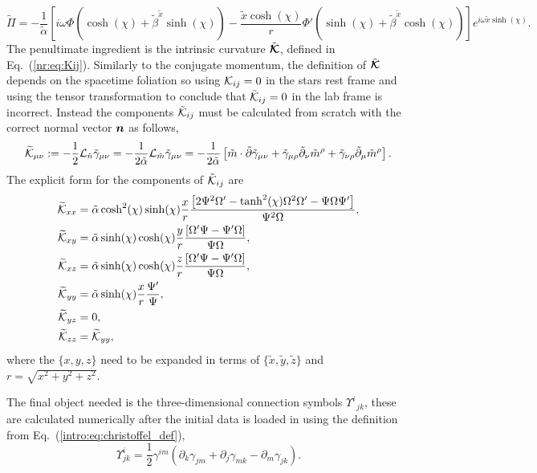 \begin{equation} \widetilde{\Pi} = -\frac{1}{\tilde{\alpha}}\left[ i\omega \Phi \left( \cosh(\chi)+\tilde{\beta}^{\tilde{x}}\sinh(\chi)\right)- \frac{\tilde{x}\cosh(\chi)}{r}\Phi'\left( \sinh(\chi)+\tilde{\beta}^{\tilde{x}} \cosh(\chi)\right)  \right]e^{i\omega \tilde{x}\sinh(\chi)}.\end{equation}
The penultimate ingredient is the intrinsic curvature $\tilde{\boldsymbol{\mathcal{K}}}$, defined in Eq.~(\ref{nr:eq:Kij}). Similarly to the conjugate momentum, the definition of $\tilde{\boldsymbol{\mathcal{K}}}$ depends on the spacetime foliation so using ${\mathcal{K}}_{ij}=0$ in the stars rest frame and using the tensor transformation to conclude that $\tilde{\mathcal{K}}_{ij}=0$ in the lab frame is incorrect. Instead the components $\tilde{\mathcal{K}}_{ij}$ must be calculated from scratch with the correct normal vector $\boldsymbol{n}$ as follows,
\begin{equation} \widetilde{\mathcal{K}}_{\mu\nu} := -\frac{1}{2}\mathcal{L}_{\tilde{n}}\tilde{\gamma}_{\mu\nu} =-\frac{1}{2\tilde{\alpha}}\mathcal{L}_{\tilde{m}}\tilde{\gamma}_{\mu\nu} = -\frac{1}{2\tilde{\alpha}}\left[ \tilde m \cdot \tilde{\partial}\tilde{\gamma}_{\mu\nu} +  \tilde{\gamma}_{\mu\rho}\tilde{\partial}_\nu \tilde{m}^\rho +\tilde{\gamma}_{\nu\rho}\tilde{\partial}_\mu \tilde{m}^\rho\right].\end{equation}
The explicit form for the components of $\tilde{\mathcal{K}}_{ij}$ are 
\begin{align} \widetilde{\mathcal{K}}_{xx} &= \tilde{\alpha}\cosh^2(\chi)\sinh(\chi)\frac{x }{r}\frac{ \left[2 \Psi^2 \Omega' -\tanh^2(\chi) \Omega^2 \Omega'-\Psi \Omega \Psi'\right]}{ \Psi^2 \Omega},\\
  \widetilde{\mathcal{K}}_{xy} &= \tilde{\alpha}\sinh(\chi)\cosh(\chi)\frac{y}{r}\frac{ \left[\Omega' \Psi- \Psi' \Omega\right]}{ \Psi \Omega },\\
  \widetilde{\mathcal{K}}_{xz} &= \tilde{\alpha}\sinh(\chi)\cosh(\chi)\frac{z}{r}\frac{  \left[\Omega' \Psi- \Psi' \Omega\right]}{ \Psi \Omega },\\
  \widetilde{\mathcal{K}}_{yy} &= \tilde{\alpha}\sinh(\chi)\frac{ x }{r}\frac{ \Psi'}{  \Psi },\\
 \widetilde{\mathcal{K}}_{yz}&=0,\\
\widetilde{\mathcal{K}}_{zz}&=\widetilde{\mathcal{K}}_{yy},\end{align}
where the $\{x,y,z\}$ need to be expanded in terms of $\{\tilde{x},  \tilde{y}, \tilde{z} \}$ and $r = \sqrt{x^2 + y^2 + z^2}$.

The final object needed is the three-dimensional connection symbols $\Upsilon^i_{\,\,\,jk}$, these are calculated numerically after the initial data is loaded in using the definition from Eq.~(\ref{intro:eq:christoffel_def}),
 \begin{equation}
\Upsilon^i_{jk} = \frac{1}{2}\gamma^{im}\left( \partial_k \gamma_{jm} +  \partial_j \gamma_{mk} -  \partial_m \gamma_{jk} \right).
 \end{equation}

